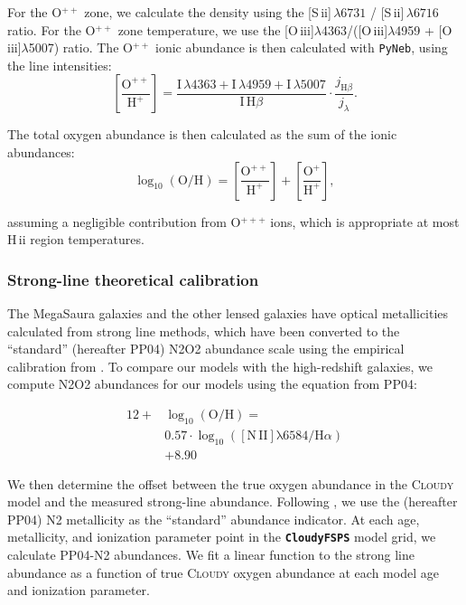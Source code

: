 \documentclass[preprint2]{aastex62}
\newcommand{\CloudyFSPS}{{\tt \textbf{CloudyFSPS}}\xspace}
\newcommand{\Cloudy}{\textsc{Cloudy}\xspace}
\newcommand{\hii}{H\,{\sc ii}\xspace}
\newcommand{\sii}{[S\,{\sc ii}]\xspace}
\newcommand{\oiii}{[O\,{\sc iii}]\xspace}
\newcommand{\logten}{\ensuremath{\log_{10}}}
\newcommand{\logOH}{\ensuremath{\logten (\mathrm{O}/\mathrm{H})}\xspace}
\newcommand{\mage}{{\sc Meg}a{\sc S}a{\sc ura}\xspace}
\begin{document}
For the O$^{++}$ zone, we calculate the density using the \sii$\,\lambda 6731$ / \sii$\,\lambda 6716$ ratio. For the O$^{++}$ zone temperature, we use the \oiii$\lambda$4363/(\oiii$\lambda$4959 + \oiii$\lambda$5007) ratio. The O$^{++}$ ionic abundance is then calculated with {\tt PyNeb}, using the line intensities:
\begin{equation}
    \left[ \frac{\mathrm{O}^{++}}{\mathrm{H}^{+}} \right] = \frac{\mathrm{I}\,\lambda 4363 + \mathrm{I}\,\lambda 4959 + \mathrm{I}\,\lambda 5007}{\mathrm{I}\,\mathrm{H}\beta} \cdot \frac{j_{\mathrm{H}\beta}}{j_{\lambda}}.
\end{equation}

The total oxygen abundance is then calculated as the sum of the ionic abundances:
\begin{equation}
    \log_{10}(\mathrm{O}/\mathrm{H}) = \left[ \frac{\mathrm{O}^{++}}{\mathrm{H}^{+}} \right] + \left[ \frac{\mathrm{O}^{+}}{\mathrm{H}^{+}} \right] ,
\end{equation}

assuming a negligible contribution from O$^{+++}$ ions, which is appropriate at most \hii region temperatures.


\subsubsection{Strong-line theoretical calibration}\label{sec:Z:corr:strong}

The \mage galaxies and the other lensed galaxies have optical metallicities calculated from strong line methods, which have been converted to the ``standard'' \citet{Pettini+2004} (hereafter PP04) N2O2 abundance scale using the empirical calibration from \citet{Kewley+2008}. To compare our models with the high-redshift galaxies, we compute N2O2 abundances for our models using the equation from PP04:

\begin{equation}\label{eq:O3N2}
\begin{aligned}
12 +& \logOH = \\
& 0.57 \cdot \log_{10}(\mathrm{[N\,II]\lambda6584}/\mathrm{H}\alpha)\\
& + 8.90
\end{aligned}
\end{equation}

We then determine the offset between the true oxygen abundance in the \Cloudy model and the measured strong-line abundance. Following \citet{Kewley+2008}, we use the \citet{Pettini+2004} (hereafter PP04) N2 metallicity as the ``standard'' abundance indicator. At each age, metallicity, and ionization parameter point in the \CloudyFSPS model grid, we calculate PP04-N2 abundances. We fit a linear function to the strong line abundance as a function of true \Cloudy oxygen abundance at each model age and ionization parameter.
\end{document}
